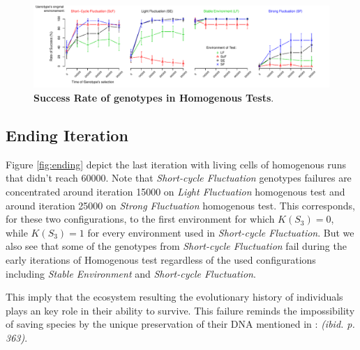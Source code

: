 \begin{figure}[h]
\centering
\includegraphics[width=2\columnwidth]{img/testSurvivingRates}
\caption{\textbf{Success Rate of genotypes in Homogenous Tests}.}
\label{fig:survrate}
\end{figure}

\subsection{Ending Iteration}

Figure \ref{fig:ending} depict the last iteration with living cells of homogenous runs that didn't reach 60000. Note that \emph{Short-cycle Fluctuation} genotypes failures are concentrated around iteration 15000 on \emph{Light Fluctuation} homogenous test and around iteration 25000 on \emph{Strong Fluctuation} homogenous test. This corresponds, for these two configurations, to the first environment for which $K(S_3)=0$, while $K(S_3)=1$ for every environment used in \emph{Short-cycle Fluctuation}. But we also see that some of the genotypes from \emph{Short-cycle Fluctuation} fail during the early iterations of Homogenous test regardless of the used configurations including \emph{Stable Environment} and \emph{Short-cycle Fluctuation}.

This imply that the ecosystem resulting the evolutionary history of individuals plays an key role in their ability to survive. This failure reminds the impossibility of saving species by the unique preservation of their DNA mentioned in \cite{jablonka2014evolution}: \emph{(ibid. p. 363)}.

